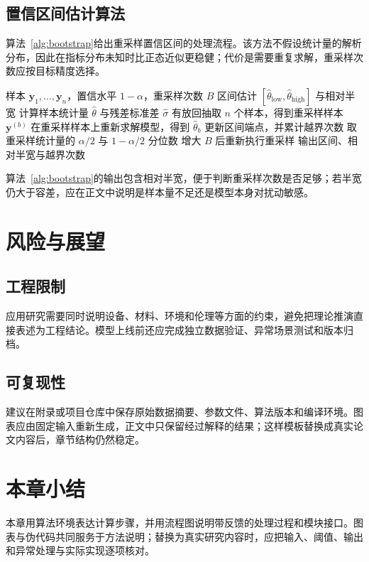 \subsection{置信区间估计算法}

算法~\ref{alg:bootstrap}给出重采样置信区间的处理流程。该方法不假设统计量的解析分布，因此在指标分布未知时比正态近似更稳健；代价是需要重复求解，重采样次数应按目标精度选择。
\begin{algorithm}[htbp]
  \caption{重采样置信区间估计}
  \label{alg:bootstrap}
  \begin{algorithmic}[1]
    \REQUIRE 样本 $\bm{y}_1,\ldots,\bm{y}_n$，置信水平 $1-\alpha$，重采样次数 $B$
    \ENSURE 区间估计 $[\hat{\theta}_{\mathrm{low}},\hat{\theta}_{\mathrm{high}}]$ 与相对半宽
    \STATE 计算样本统计量 $\hat{\theta}$ 与残差标准差 $\hat{\sigma}$
      \STATE 有放回抽取 $n$ 个样本，得到重采样样本 $\bm{y}^{(b)}$
      \STATE 在重采样样本上重新求解模型，得到 $\hat{\theta}_b$
        \STATE 更新区间端点，并累计越界次数
      \ENDIF
    \ENDFOR
    \STATE 取重采样统计量的 $\alpha/2$ 与 $1-\alpha/2$ 分位数
      \STATE 增大 $B$ 后重新执行重采样
    \ENDIF
    \STATE 输出区间、相对半宽与越界次数
  \end{algorithmic}
\end{algorithm}

算法~\ref{alg:bootstrap}的输出包含相对半宽，便于判断重采样次数是否足够；若半宽仍大于容差，应在正文中说明是样本量不足还是模型本身对扰动敏感。

\section{风险与展望}

\subsection{工程限制}

应用研究需要同时说明设备、材料、环境和伦理等方面的约束，避免把理论推演直接表述为工程结论。模型上线前还应完成独立数据验证、异常场景测试和版本归档。

\subsection{可复现性}

建议在附录或项目仓库中保存原始数据摘要、参数文件、算法版本和编译环境。图表应由固定输入重新生成，正文中只保留经过解释的结果；这样模板替换成真实论文内容后，章节结构仍然稳定。

\section{本章小结}

本章用算法环境表达计算步骤，并用流程图说明带反馈的处理过程和模块接口。图表与伪代码共同服务于方法说明；替换为真实研究内容时，应把输入、阈值、输出和异常处理与实际实现逐项核对。
